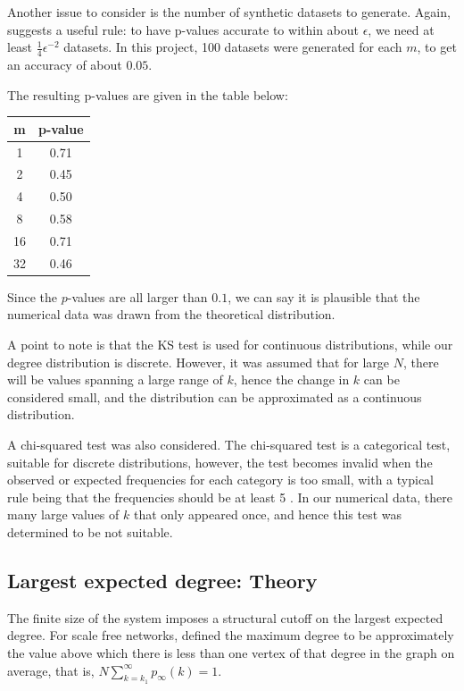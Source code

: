 Another issue to consider is the number of synthetic datasets to generate. Again, \citet{Clauset2009} suggests a useful rule: to have p-values accurate to within about $\epsilon$, we need at least $\frac{1}{4}\epsilon^{-2}$ datasets. In this project, 100 datasets were generated for each $m$, to get an accuracy of about $0.05$. 

The resulting p-values are given in the table below:
\begin{center}
\begin{tabular}{ c | c }
 m &  p-value\\ 
 \hline
 1 & 0.71 \\  
 2 & 0.45 \\
 4 & 0.50 \\
 8 & 0.58 \\
 16 & 0.71 \\
 32 & 0.46 \\  
\end{tabular}
\label{table:ks-test-all}
\end{center}

Since the $p$-values are all larger than $0.1$, we can say it is plausible that the numerical data was drawn from the theoretical distribution. 

A point to note is that the KS test is used for continuous distributions, while our degree distribution is discrete. However, it was assumed that for large $N$, there will be values spanning a large range of $k$, hence the change in $k$ can be considered small, and the distribution can be approximated as a continuous distribution. 

A chi-squared test was also considered. The chi-squared test is a categorical test, suitable for discrete distributions, however, the test becomes invalid when the observed or expected frequencies for each category is too small, with a typical rule being that the frequencies should be at least 5 \citep{Lawrence1997}. In our numerical data, there many large values of $k$ that only appeared once, and hence this test was determined to be not suitable. 

\subsection{Largest expected degree: Theory}
The finite size of the system imposes a structural cutoff on the largest expected degree. For scale free networks, \citet{Aiello2001a} defined the maximum degree to be approximately the value above which there is less than one vertex of that degree in the graph on average, that is, $N \sum_{k = k_1}^\infty p_\infty(k) = 1$. 

